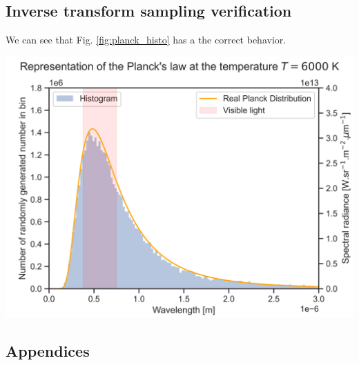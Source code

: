 \documentclass[10pt,a4paper,oneside]{article}
\begin{document}
\begin{multicols}{2}
\subsection{Inverse transform sampling verification}
We can see that Fig. \ref{fig:planck_histo} has a the correct behavior.
\begin{Figure}
 \centering
 \includegraphics[width=1 \linewidth]{SCHEMA/planck.png}
 \label{fig:planck_histo}
\end{Figure}

\end{multicols}











\clearpage


\nocite{*}


\clearpage
\begin{appendices}
\section{Appendices}

\end{appendices}
\end{document}
